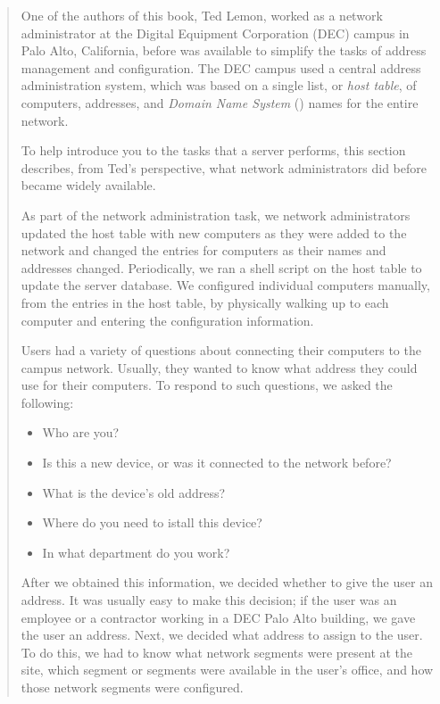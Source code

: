 \begin{quotation}
\noindent
One of the authors of this book, Ted Lemon, worked as a network administrator at the Digital Equipment Corporation (DEC) campus in Palo Alto, California, before  was available to simplify the tasks of address management and configuration.
The DEC campus used a central  address administration system, which was based on a single list, or \emph{host table}, of computers,  addresses, and \emph{Domain Name System} () names for the entire network.

To help introduce you to the tasks that a  server performs, this section describes, from Ted’s perspective, what network administrators did before  became widely available.

As part of the network administration task, we network administrators updated the host table with new computers as they were added to the network and changed the entries for computers as their names and addresses changed.
Periodically, we ran a shell script on the host table to update the  server database.
We configured individual computers manually, from the entries in the host table, by physically walking up to each computer and entering the configuration information.

Users had a variety of questions about connecting their computers to the campus network.
Usually, they wanted to know what  address they could use for their computers.
To respond to such questions, we asked the following:
\begin{itemize}
\item Who are you?
\item Is this a new device, or was it connected to the network before?
\item What is the device's old  address?
\item Where do you need to istall this device?
\item In what department do you work?
\end{itemize}

After we obtained this information, we decided whether to give the user an  address.
It was usually easy to make this decision; if the user was an employee or a contractor working in a DEC Palo Alto building, we gave the user an address.
Next, we decided what  address to assign to the user.
To do this, we had to know what network segments were present at the site, which segment or segments were available in the user's office, and how those network segments were configured.


\end{quotation}
